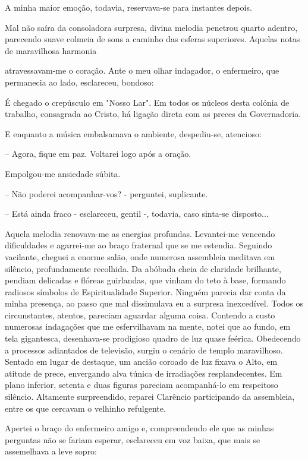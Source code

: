 \documentclass[portuguese,12pt,a4paper]{scrbook}
\begin{document}
	A minha maior emoção, todavia, reservava-se para instantes depois.
	
	Mal não saíra da consoladora surpresa, divina melodia penetrou quarto adentro, parecendo suave colmeia de sons a caminho das esferas superiores. Aquelas notas de maravilhosa harmonia
	
	
	atravessavam-me o coração. Ante o meu olhar indagador, o enfermeiro, que permanecia ao lado, esclareceu, bondoso:
	
	É chegado o crepúsculo em "Nosso Lar". Em todos os núcleos desta colónia de trabalho, consagrada ao Cristo, há ligação direta com as preces da Governadoria.
	
	E enquanto a música embalsamava o ambiente, despediu-se, atencioso:
	
	– Agora, fique em paz. Voltarei logo após a oração.
	
	Empolgou-me ansiedade súbita.
	
	– Não poderei acompanhar-vos? - perguntei, suplicante.
	
	– Está ainda fraco - esclareceu, gentil -, todavia, caso sinta-se disposto...
	
	Aquela melodia renovava-me as energias profundas. Levantei-me vencendo dificuldades e agarrei-me ao braço fraternal que se me estendia. Seguindo vacilante, cheguei a enorme salão, onde numerosa assembleia meditava em silêncio, profundamente recolhida. Da abóbada cheia de claridade brilhante, pendiam delicadas e flóreas guirlandas, que vinham do teto à base, formando radiosos símbolos de Espiritualidade Superior. Ninguém parecia dar conta da minha presença, ao passo que mal dissimulava eu a surpresa inexcedível. Todos os circunstantes, atentos, pareciam aguardar alguma coisa. Contendo a custo numerosas indagações que me esfervilhavam na mente, notei que ao fundo, em tela gigantesca, desenhava-se prodigioso quadro de luz quase feérica. Obedecendo a processos adiantados de televisão, surgiu o cenário de templo maravilhoso. Sentado em lugar de destaque, um ancião coroado de luz fixava o Alto, em atitude de prece, envergando alva túnica de irradiações resplandecentes. Em plano inferior, setenta e duas figuras pareciam acompanhá-lo em respeitoso silêncio. Altamente surpreendido, reparei Clarêncio participando da assembleia, entre os que cercavam o velhinho refulgente.
	
	
	Apertei o braço do enfermeiro amigo e, compreendendo ele que as minhas perguntas não se fariam esperar, esclareceu em voz baixa, que mais se assemelhava a leve sopro:
	
\end{document}
